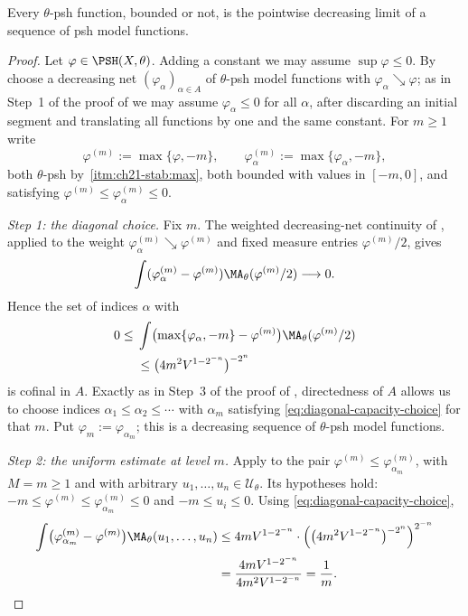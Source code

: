 \begin{corollary}
\label{cor:psh-sequential-regularization}
Every $\theta$-psh function, bounded or not, is the pointwise decreasing
limit of a sequence of psh model functions.
\end{corollary}

\begin{proof}
Let $\varphi\in\PSH(X,\theta)$.  Adding a constant we may assume
$\sup\varphi\leq0$.  By  choose a
decreasing net $(\varphi_\alpha)_{\alpha\in A}$ of $\theta$-psh model
functions with $\varphi_\alpha\searrow\varphi$; as in Step~1 of the proof
of  we may assume $\varphi_\alpha\leq0$
for all $\alpha$, after discarding an initial segment and translating all
functions by one and the same constant.  For $m\geq1$ write
\[
 \varphi^{(m)}:=\max\{\varphi,-m\},\qquad
 \varphi^{(m)}_\alpha:=\max\{\varphi_\alpha,-m\} ,
\]
both $\theta$-psh by
\,\cref{itm:ch21-stab:max}, both bounded with values
in $[-m,0]$, and satisfying
$\varphi^{(m)}\leq\varphi^{(m)}_\alpha\leq0$.

\emph{Step 1: the diagonal choice.}  Fix $m$.  The weighted decreasing-net
continuity of , applied to the weight
$\varphi^{(m)}_\alpha\searrow\varphi^{(m)}$ and fixed measure entries
$\varphi^{(m)}/2$, gives
\[
 \int(\varphi^{(m)}_\alpha-\varphi^{(m)})
       \MA_\theta(\varphi^{(m)}/2)\longrightarrow0.
\]
Hence the set of indices $\alpha$ with
\begin{equation}
\label{eq:diagonal-capacity-choice}
\begin{split}
0\leq{}&\int\bigl(\max\{\varphi_{\alpha},-m\}-\varphi^{(m)}\bigr)
               \MA_\theta(\varphi^{(m)}/2)\\
&\leq \bigl(4m^2V^{1-2^{-n}}\bigr)^{-2^n}
\end{split}
\end{equation}
is cofinal in $A$.  Exactly as in Step~3 of the proof of
, directedness of $A$ allows us to choose
indices $\alpha_1\leq\alpha_2\leq\cdots$ with $\alpha_m$ satisfying
\eqref{eq:diagonal-capacity-choice} for that $m$.  Put
$\varphi_m:=\varphi_{\alpha_m}$; this is a decreasing sequence of
$\theta$-psh model functions.

\emph{Step 2: the uniform estimate at level $m$.}  Apply
 to the pair
$\varphi^{(m)}\leq\varphi^{(m)}_{\alpha_m}$, with $M=m\geq1$ and with
arbitrary $u_1,\ldots,u_n\in\mathcal U_\theta$.  Its hypotheses hold:
$-m\leq\varphi^{(m)}\leq\varphi^{(m)}_{\alpha_m}\leq0$ and
$-m\leq u_i\leq0$.  Using \eqref{eq:diagonal-capacity-choice},
\[
 \begin{aligned}
 \int\bigl(\varphi^{(m)}_{\alpha_m}-\varphi^{(m)}\bigr)
       \MA_\theta(u_1,\ldots,u_n)
 &\leq4mV^{1-2^{-n}}\cdot
   \Bigl(\bigl(4m^2V^{1-2^{-n}}\bigr)^{-2^n}\Bigr)^{2^{-n}}
 \\
 &=\frac{4mV^{1-2^{-n}}}{4m^2V^{1-2^{-n}}}
  =\frac1m .
 \end{aligned}
\]


\end{proof}
